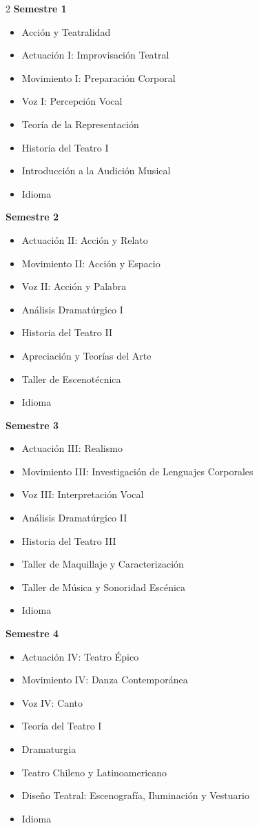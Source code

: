\documentclass[12pt,a4paper]{article}
\begin{document}
	\begin{multicols}{2}
		\textbf{Semestre 1}
		\begin{itemize}
			\item Acción y Teatralidad
			\item Actuación I: Improvisación Teatral
			\item Movimiento I: Preparación Corporal
			\item Voz I: Percepción Vocal
			\item Teoría de la Representación
			\item Historia del Teatro I
			\item Introducción a la Audición Musical
			\item Idioma
		\end{itemize}
		
		\textbf{Semestre 2}
		\begin{itemize}
			\item Actuación II: Acción y Relato
			\item Movimiento II: Acción y Espacio
			\item Voz II: Acción y Palabra
			\item Análisis Dramatúrgico I
			\item Historia del Teatro II
			\item Apreciación y Teorías del Arte
			\item Taller de Escenotécnica
			\item Idioma
		\end{itemize}
		
		\textbf{Semestre 3}
		\begin{itemize}
			\item Actuación III: Realismo
			\item Movimiento III: Investigación de Lenguajes Corporales
			\item Voz III: Interpretación Vocal
			\item Análisis Dramatúrgico II
			\item Historia del Teatro III
			\item Taller de Maquillaje y Caracterización
			\item Taller de Música y Sonoridad Escénica
			\item Idioma
		\end{itemize}
		
		\textbf{Semestre 4}
		\begin{itemize}
			\item Actuación IV: Teatro Épico
			\item Movimiento IV: Danza Contemporánea
			\item Voz IV: Canto
			\item Teoría del Teatro I
			\item Dramaturgia
			\item Teatro Chileno y Latinoamericano
			\item Diseño Teatral: Escenografía, Iluminación y Vestuario
			\item Idioma
		\end{itemize}
		

\end{multicols}
\end{document}
